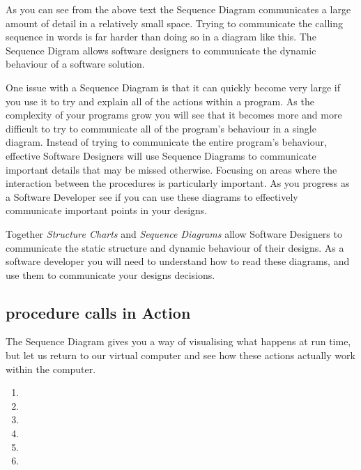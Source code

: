 As you can see from the above text the Sequence Diagram communicates a large amount of detail in a relatively small space. Trying to communicate the calling sequence in words is far harder than doing so in a diagram like this. The Sequence Digram allows software designers to communicate the dynamic behaviour of a software solution.

One issue with a Sequence Diagram is that it can quickly become very large if you use it to try and explain all of the actions within a program. As the complexity of your programs grow you will see that it becomes more and more difficult to try to communicate all of the program's behaviour in a single diagram. Instead of trying to communicate the entire program's behaviour, effective Software Designers will use Sequence Diagrams to communicate important details that may be missed otherwise. Focusing on areas where the interaction between the procedures is particularly important. As you progress as a Software Developer see if you can use these diagrams to effectively communicate important points in your designs.

\bigskip

Together \emph{Structure Charts} and \emph{Sequence Diagrams} allow Software Designers to communicate the static structure and dynamic behaviour of their designs. As a software developer you will need to understand how to read these diagrams, and use them to communicate your designs decisions.


\subsection{procedure calls in Action} %
\label{sub:procedure_calls_in_action}

The Sequence Diagram gives you a way of visualising what happens at run time, but let us return to our virtual computer and see how these actions actually work within the computer. 

\begin{enumerate}
  \item {}
  \item {}
  \item {}
  \item {}
  \item {}
  \item {}
\end{enumerate}

